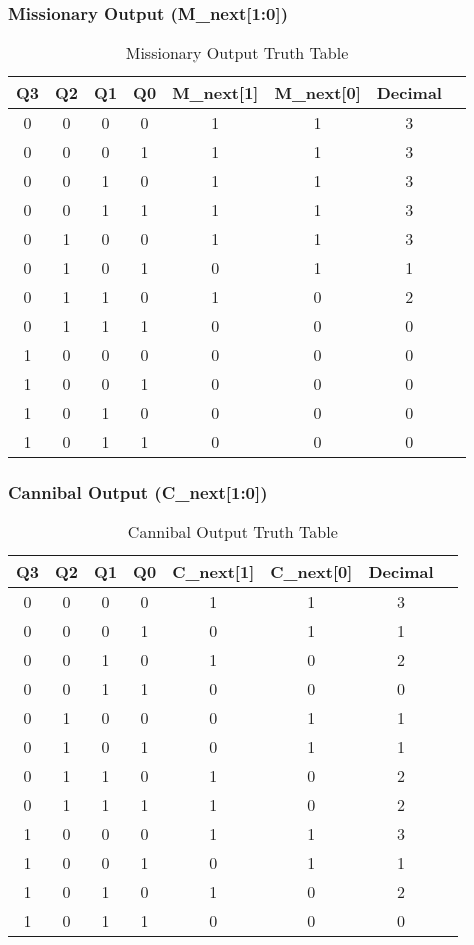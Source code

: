 \documentclass[12pt,letterpaper]{article}
\begin{document}
\subsubsection{Missionary Output (M\_next[1:0])}
\begin{table}[H]
\centering
\caption{Missionary Output Truth Table}
\begin{tabular}{@{}cccccccc@{}}
\toprule
\textbf{Q3} & \textbf{Q2} & \textbf{Q1} & \textbf{Q0} & \textbf{M\_next[1]} & \textbf{M\_next[0]} & \textbf{Decimal} \\
\midrule
0 & 0 & 0 & 0 & 1 & 1 & 3 \\
0 & 0 & 0 & 1 & 1 & 1 & 3 \\
0 & 0 & 1 & 0 & 1 & 1 & 3 \\
0 & 0 & 1 & 1 & 1 & 1 & 3 \\
0 & 1 & 0 & 0 & 1 & 1 & 3 \\
0 & 1 & 0 & 1 & 0 & 1 & 1 \\
0 & 1 & 1 & 0 & 1 & 0 & 2 \\
0 & 1 & 1 & 1 & 0 & 0 & 0 \\
1 & 0 & 0 & 0 & 0 & 0 & 0 \\
1 & 0 & 0 & 1 & 0 & 0 & 0 \\
1 & 0 & 1 & 0 & 0 & 0 & 0 \\
1 & 0 & 1 & 1 & 0 & 0 & 0 \\
\bottomrule
\end{tabular}
\label{tab:missionary_truth}
\end{table}

\subsubsection{Cannibal Output (C\_next[1:0])}
\begin{table}[H]
\centering
\caption{Cannibal Output Truth Table}
\begin{tabular}{@{}cccccccc@{}}
\toprule
\textbf{Q3} & \textbf{Q2} & \textbf{Q1} & \textbf{Q0} & \textbf{C\_next[1]} & \textbf{C\_next[0]} & \textbf{Decimal} \\
\midrule
0 & 0 & 0 & 0 & 1 & 1 & 3 \\
0 & 0 & 0 & 1 & 0 & 1 & 1 \\
0 & 0 & 1 & 0 & 1 & 0 & 2 \\
0 & 0 & 1 & 1 & 0 & 0 & 0 \\
0 & 1 & 0 & 0 & 0 & 1 & 1 \\
0 & 1 & 0 & 1 & 0 & 1 & 1 \\
0 & 1 & 1 & 0 & 1 & 0 & 2 \\
0 & 1 & 1 & 1 & 1 & 0 & 2 \\
1 & 0 & 0 & 0 & 1 & 1 & 3 \\
1 & 0 & 0 & 1 & 0 & 1 & 1 \\
1 & 0 & 1 & 0 & 1 & 0 & 2 \\
1 & 0 & 1 & 1 & 0 & 0 & 0 \\
\bottomrule
\end{tabular}
\label{tab:cannibal_truth}
\end{table}
\end{document}
